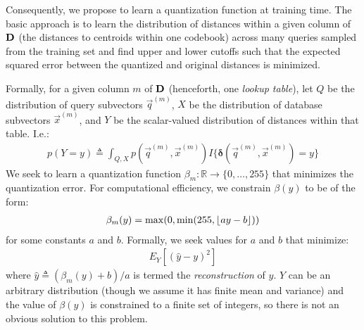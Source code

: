 Consequently, we propose to learn a quantization function at training time. The basic approach is to learn the distribution of distances within a given column of $\mat{D}$ (the distances to centroids within one codebook) across many queries sampled from the training set and find upper and lower cutoffs such that the expected squared error between the quantized and original distances is minimized.

Formally, for a given column $m$ of $\mat{D}$ (henceforth, one \textit{lookup table}), let $Q$ be the distribution of query subvectors $\vec{q}^{(m)}$, $X$ be the distribution of database subvectors $\vec{x}^{(m)}$, and $Y$ be the scalar-valued distribution of distances within that table. I.e.:
\begin{align}
    p(Y = y) \triangleq \int_{Q, X} p(\vec{q}^{(m)}, \vec{x}^{(m)})I\{\boldsymbol{\delta} \left( \vec{q}^{(m)}, \vec{x}^{(m)} \right) = y\}
\end{align}
We seek to learn a quantization function $\beta_m: \mathbb{R} \rightarrow \{0,\ldots,255\} $ that minimizes the quantization error. For computational efficiency, we constrain $\beta(y)$ to be of the form:
\begin{align}
    \beta_m(y) = \max(0, \min(255, \floor*{ay - b}))
\end{align}
for some constants $a$ and $b$. Formally, we seek values for $a$ and $b$ that minimize:
\begin{align}
    E_Y[(\hat{y} - y)^2]
\end{align}
where $\hat{y} \triangleq (\beta_m(y) + b)/a$ is termed the \textit{reconstruction} of $y$.
$Y$ can be an arbitrary distribution (though we assume it has finite mean and variance) and the value of $\beta(y)$ is constrained to a finite set of integers, so there is not an obvious solution to this problem.

